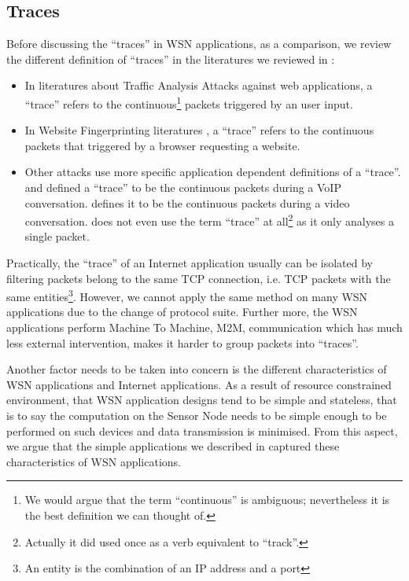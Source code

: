 \subsection{Traces} \label{Subsec: Traces}

Before discussing the ``traces'' in WSN applications, as a comparison, we review the different definition of ``traces'' in the literatures we reviewed in :

\begin{itemize}
	\item In literatures about Traffic Analysis Attacks against web applications\cite{WebSideChannel}\cite{PinpointWeb}\cite{SearchAttack}, a ``trace'' refers to the continuous\footnote{We would argue that the term ``continuous'' is ambiguous; nevertheless it is the best definition we can thought of.} packets triggered by an user input.
	\item In Website Fingerprinting literatures\cite{WebsiteFingerprint} \cite{HClassifier} \cite{PClassifier} \cite{Peekaboo}, a ``trace'' refers to the continuous packets that triggered by a browser requesting a website.
	\item Other attacks use more specific application dependent definitions of a ``trace''. \cite{VoIPLanguage} and \cite{VoIPPhrases} defined a ``trace'' to be the continuous packets during a VoIP conversation. \cite{Video} defines it to be the continuous packets during a video conversation. \cite{AppleMessage} does not even use the term ``trace'' at all\footnote{Actually it did used once as a verb equivalent to ``track''.} as it only analyses a single packet.
\end{itemize}

Practically, the ``trace'' of an Internet application usually can be isolated by filtering packets belong to the same TCP connection, i.e. TCP packets with the same entities\footnote{An entity is the combination of an IP address and a port}. However, we cannot apply the same method on many WSN applications due to the change of protocol suite. Further more, the WSN applications perform Machine To Machine, M2M, communication which has much less external intervention, makes it harder to group packets into ``traces''.

Another factor needs to be taken into concern is the different characteristics of WSN applications and Internet applications. As a result of resource constrained environment, that WSN application designs tend to be simple and stateless, that is to say the computation on the Sensor Node needs to be simple enough to be performed on such devices and data transmission is minimised. From this aspect, we argue that the simple applications we described in  captured these characteristics of WSN applications.  


